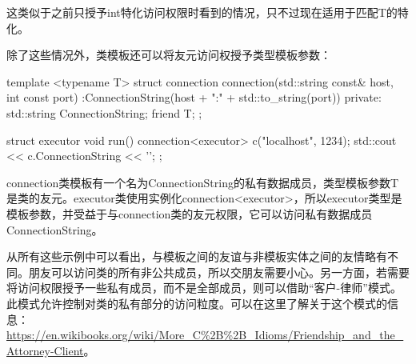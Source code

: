 这类似于之前只授予int特化访问权限时看到的情况，只不过现在适用于匹配T的特化。

除了这些情况外，类模板还可以将友元访问权授予类型模板参数：

\begin{cpp}
template <typename T>
struct connection
{
	connection(std::string const& host, int const port)
		:ConnectionString(host + ":" + std::to_string(port))
	{}
private:
	std::string ConnectionString;
	friend T;
};

struct executor
{
	void run()
	{
		connection<executor> c("localhost", 1234);
		std::cout << c.ConnectionString << '\n';
	}
};
\end{cpp}

connection类模板有一个名为ConnectionString的私有数据成员，类型模板参数T是类的友元。executor类使用实例化connection<executor>，所以executor类型是模板参数，并受益于与connection类的友元权限，它可以访问私有数据成员ConnectionString。
 
从所有这些示例中可以看出，与模板之间的友谊与非模板实体之间的友情略有不同。朋友可以访问类的所有非公共成员，所以交朋友需要小心。另一方面，若需要将访问权限授予一些私有成员，而不是全部成员，则可以借助“客户-律师”模式。此模式允许控制对类的私有部分的访问粒度。可以在这里了解关于这个模式的信息： \url{https://en.wikibooks.org/wiki/More_C%2B%2B_Idioms/Friendship_and_the_Attorney-Client}。


